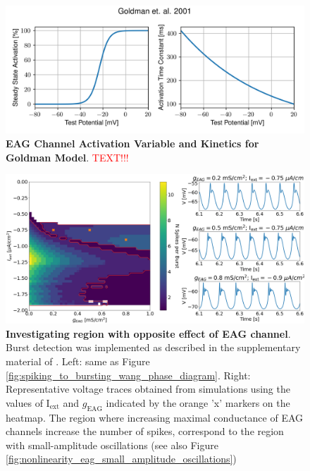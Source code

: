 \documentclass[../main.tex]{subfiles}
\begin{document}
\begin{figure}[!t]
    \centering
    \includegraphics[width=0.8\linewidth]{../img/spiking_to_bursting/eag_goldman.png}
    \caption[EAG Channel Activation Variable and Kinetics for Goldman Model]{
        \textbf{EAG Channel Activation Variable and Kinetics for Goldman Model}. \textcolor{red}{TEXT!!!}
    }
    \label{fig:spiking_to_bursting_eag_params_goldman}
\end{figure}

\begin{figure}[!t]
    \centering
    \includegraphics[width=0.9\linewidth]{../img/spiking_to_bursting/nonlinearity_eag.png}
    \caption[Investigating region with opposite effect of EAG channel]{
        \textbf{Investigating region with opposite effect of EAG channel}. Burst detection was implemented as described in the supplementary material of \parencite{franciRobustTunableBursting2018}. Left: same as Figure \ref{fig:spiking_to_bursting_wang_phase_diagram}. Right: Representative voltage traces obtained from simulations using the values of I$_{\text{ext}}$ and $g_{\text{EAG}}$ indicated by the orange 'x' markers on the heatmap. The region where increasing maximal conductance of EAG channels increase the number of spikes, correspond to the region with small-amplitude oscillations (see also Figure \ref{fig:nonlinearity_eag_small_amplitude_oscillations})
    }
    \label{fig:nonlinearity_eag}
\end{figure}
\end{document}
